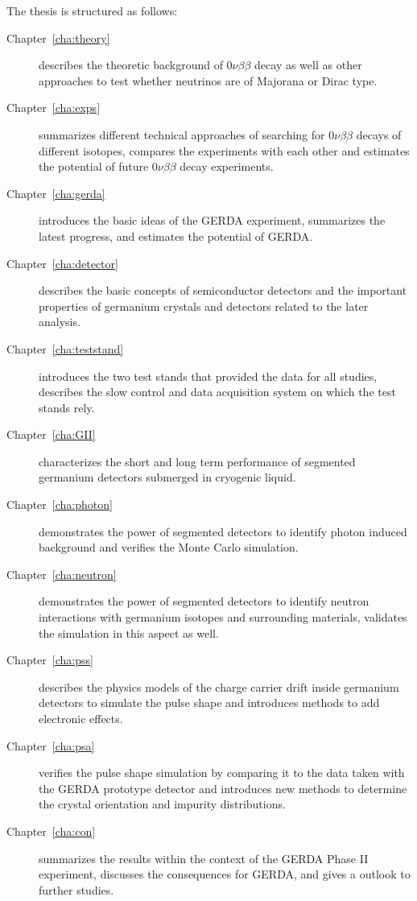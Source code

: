 The thesis is structured as follows:
\begin{description}
\item[Chapter~\ref{cha:theory}] describes the theoretic background of $0\nu\beta\beta$ decay as well as other approaches to test whether neutrinos are of Majorana or Dirac type.
\item[Chapter~\ref{cha:exps}] summarizes different technical approaches of searching for $0\nu\beta\beta$ decays of different isotopes, compares the experiments with each other and estimates the potential of future $0\nu\beta\beta$ decay experiments.
\item[Chapter~\ref{cha:gerda}] introduces the basic ideas of the GERDA experiment, summarizes the latest progress, and estimates the potential of GERDA.
\item[Chapter~\ref{cha:detector}] describes the basic concepts of semiconductor detectors and the important properties of germanium crystals and detectors related to the later analysis.
\item[Chapter~\ref{cha:teststand}] introduces the two test stands that provided the data for all studies, describes the slow control and data acquisition system on which the test stands rely.
\item[Chapter~\ref{cha:GII}] characterizes the short and long term performance of segmented germanium detectors submerged in cryogenic liquid.
\item[Chapter~\ref{cha:photon}] demonstrates the power of segmented detectors to identify photon induced background and verifies the Monte Carlo simulation.
\item[Chapter~\ref{cha:neutron}] demonstrates the power of segmented detectors to identify neutron interactions with germanium isotopes and surrounding materials, validates the simulation in this aspect as well.
\item[Chapter~\ref{cha:pss}] describes the physics models of the charge carrier drift inside germanium detectors to simulate the pulse shape and introduces methods to add electronic effects.
\item[Chapter~\ref{cha:psa}] verifies the pulse shape simulation by comparing it to the data taken with the GERDA prototype detector and introduces new methods to determine the crystal orientation and impurity distributions.
\item[Chapter~\ref{cha:con}] summarizes the results within the context of the GERDA Phase II experiment, discusses the consequences for GERDA, and gives a outlook to further studies.
\end{description}

